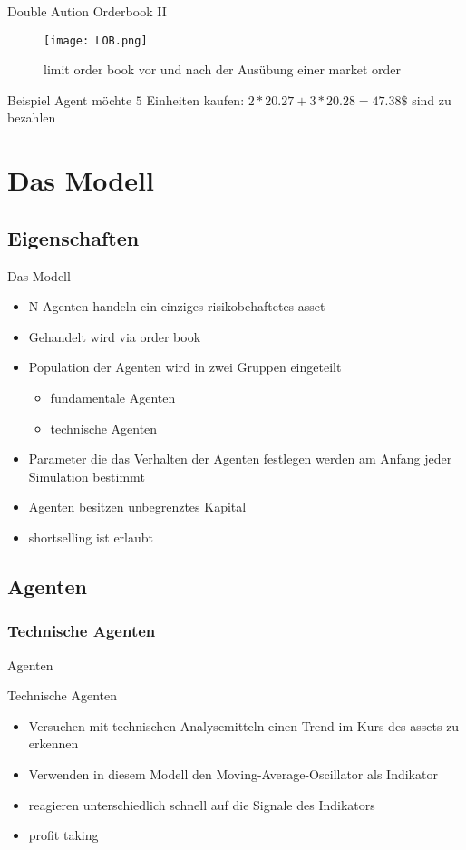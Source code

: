 \documentclass{beamer}
\begin{document}
	\begin{frame}{Double Aution Orderbook II}	
		\begin{figure}[h!]
			\texttt{[image: LOB.png]}
			\caption{limit order book vor und nach der Ausübung einer market order}
		\end{figure}
		\begin{exampleblock}{Beispiel}
			Agent möchte $5$ Einheiten kaufen:
			$2*20.27+3*20.28=47.38\$$ sind zu bezahlen
		\end{exampleblock}	
	\end{frame}
\section{Das Modell}
\subsection{Eigenschaften}
	\begin{frame}{Das Modell}
		\begin{itemize}
			\item N Agenten handeln ein einziges risikobehaftetes asset
			\item Gehandelt wird via order book
			\item Population der Agenten wird in zwei Gruppen eingeteilt
			\begin{itemize}
				\item fundamentale Agenten
				\item technische Agenten
			\end{itemize}
			\item Parameter die das Verhalten der Agenten festlegen werden am Anfang jeder Simulation bestimmt
			\item Agenten besitzen unbegrenztes Kapital
			\item shortselling ist erlaubt
		\end{itemize}	
	\end{frame}
\subsection{Agenten}
\subsubsection{Technische Agenten}
	\begin{frame}{Agenten}
		\begin{block}{Technische Agenten}	
			\begin{itemize}
				\item Versuchen mit technischen Analysemitteln einen Trend im Kurs des assets zu erkennen
				\item Verwenden in diesem Modell den Moving-Average-Oscillator als Indikator 
				\item reagieren unterschiedlich schnell auf die Signale des Indikators
				\item profit taking
			\end{itemize}
		\end{block}
	\end{frame}
\end{document}
